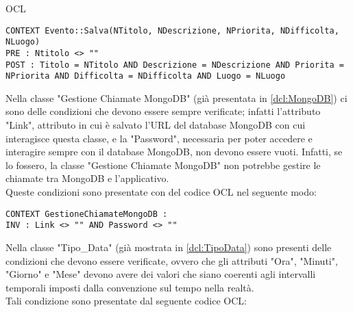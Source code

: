 \begin{listaPersonale}{OCL}
    \begin{lstlisting}
CONTEXT Evento::Salva(NTitolo, NDescrizione, NPriorita, NDifficolta, NLuogo)
PRE : Ntitolo <> ""
POST : Titolo = NTitolo AND Descrizione = NDescrizione AND Priorita = NPriorita AND Difficolta = NDifficolta AND Luogo = NLuogo 
    \end{lstlisting}




    \begin{center}
        
    \end{center}
    Nella classe "Gestione Chiamate MongoDB" (già presentata in \ref{dcl:MongoDB}) ci sono delle condizioni che devono essere sempre verificate; infatti l'attributo "Link", attributo in cui è salvato l'URL del database MongoDB con cui interagisce questa classe, e la "Password", necessaria per poter accedere e interagire sempre con il database MongoDB, non devono essere vuoti. Infatti, se lo fossero, la classe "Gestione Chiamate MongoDB" non potrebbe gestire le chiamate tra MongoDB e l'applicativo.\\
    Queste condizioni sono presentate con del codice OCL nel seguente modo:

    \begin{lstlisting}
CONTEXT GestioneChiamateMongoDB :
INV : Link <> "" AND Password <> "" 
    \end{lstlisting}




    \begin{center}
        
    \end{center}
    Nella classe "Tipo\_Data" (già mostrata in \ref{dcl:TipoData}) sono presenti delle condizioni che devono essere verificate, ovvero che gli attributi "Ora", "Minuti", "Giorno" e "Mese" devono avere dei valori che siano coerenti agli intervalli temporali imposti dalla convenzione sul tempo nella realtà.\\
    Tali condizione sono presentate dal seguente codice OCL:


\end{listaPersonale}
